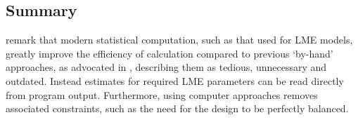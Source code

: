 \documentclass[12pt, a4paper]{report}
\theoremstyle{plain}
\theoremstyle{definition}
\theoremstyle{remark}
\begin{document}
\subsection{Summary}
\citet{BXC2008} remark that modern statistical computation, such as that used for LME models, greatly improve the efficiency of calculation compared to previous `by-hand' approaches, as advocated in \citet{BA99}, describing them as tedious, unnecessary and outdated. Instead estimates for required LME parameters can be read directly from program output. Furthermore, using computer approaches removes associated constraints, such as the need for the design to be perfectly balanced.









\end{document}
